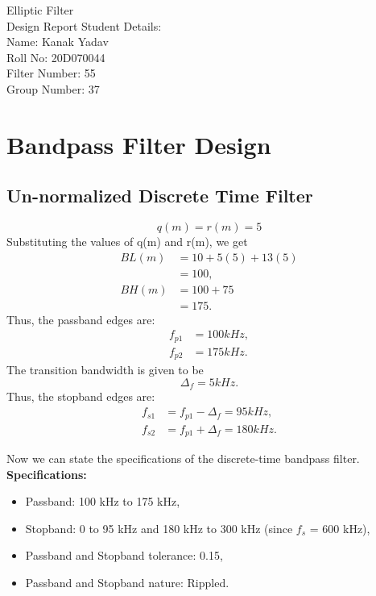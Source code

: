 \documentclass[12pt]{article}
\begin{document}
\begin{titlepage}
    \begin{center}
        \huge
        Elliptic Filter\\Design Report
        \vfill
        \large
        Student Details:\\\vspace{3pt}
        Name: Kanak Yadav\\\vspace{3pt}
        Roll No: 20D070044\\\vspace{3pt}
        Filter Number: 55\\\vspace{3pt}
        Group Number: 37\\\vspace{60pt}
        \vfill
    \end{center}
\end{titlepage}

\section{Bandpass Filter Design}
\subsection{Un-normalized Discrete Time Filter}
\[q(m) = r(m) = 5\]
Substituting the values of q(m) and r(m), we get
\begin{align*}
    BL(m) &= 10 + 5(5) + 13(5)\\
    &= 100,\\
    BH(m) &= 100 + 75\\
    &= 175.
\end{align*}
Thus, the passband edges are:
\begin{align*}
    f_{p1} &= 100 kHz,\\
    f_{p2} &= 175 kHz.
\end{align*}
The transition bandwidth is given to be\[\Delta_f = 5 kHz.\]
Thus, the stopband edges are:
\begin{align*}
    f_{s1} &= f_{p1} - \Delta_f = 95 kHz,\\
    f_{s2} &= f_{p1} + \Delta_f = 180 kHz.
\end{align*}

Now we can state the specifications of the discrete-time bandpass filter.
\newline
\hline
\vspace{10pt}
\textbf{Specifications:}
\begin{itemize}
    \item Passband: 100 kHz to 175 kHz,
    \item Stopband: 0 to 95 kHz and 180 kHz to 300 kHz (since $f_s$ = 600 kHz),
    \item Passband and Stopband tolerance: 0.15,
    \item Passband and Stopband nature: Rippled.
\end{itemize}
\hline
\end{document}
